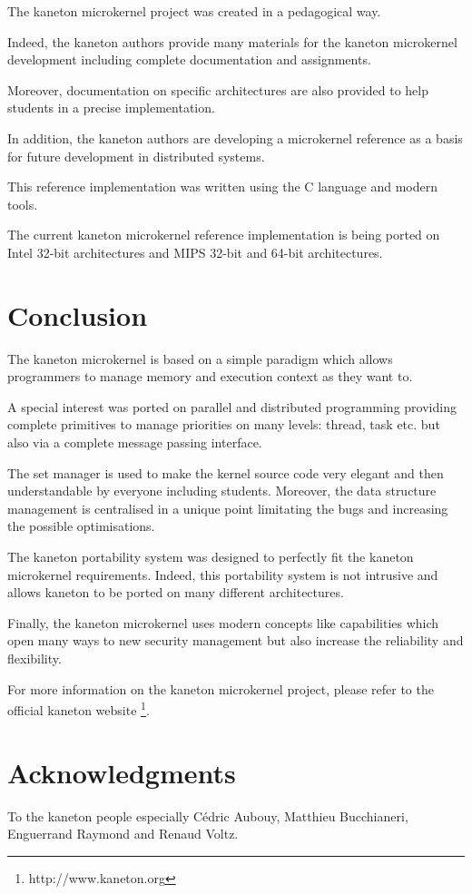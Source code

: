 \begin{multicols}{2}
The kaneton microkernel project was created in a pedagogical way.

Indeed, the kaneton authors provide many materials for the kaneton
microkernel development including complete documentation and assignments.

Moreover, documentation on specific architectures are also provided
to help students in a precise implementation.

In addition, the kaneton authors are developing a microkernel reference
as a basis for future development in distributed systems.

This reference implementation was written using the C language and
modern tools.

The current kaneton microkernel reference implementation is being
ported on Intel 32-bit architectures and MIPS 32-bit and 64-bit architectures.

%
%

\section{Conclusion}

The kaneton microkernel is based on a simple paradigm which allows
programmers to manage memory and execution context as they want to.

A special interest was ported on parallel and distributed programming
providing complete primitives to manage priorities on many levels:
thread, task etc. but also via a complete message passing interface.

The set manager is used to make the kernel source code very elegant
and then understandable by everyone including students. Moreover, the
data structure management is centralised in a unique point limitating
the bugs and increasing the possible optimisations.

The kaneton portability system was designed to perfectly fit the
kaneton microkernel requirements. Indeed, this portability system
is not intrusive and allows kaneton to be ported on many different
architectures.

Finally, the kaneton microkernel uses modern concepts like
capabilities which open many ways to new security management but
also increase the reliability and flexibility.

For more information on the kaneton microkernel project, please refer
to the official kaneton website
  \footnote{http://www.kaneton.org}.

%
%

\section{Acknowledgments}

To the kaneton people especially C\'edric Aubouy, Matthieu Bucchianeri,
Enguerrand Raymond and Renaud Voltz.

\end{multicols}


